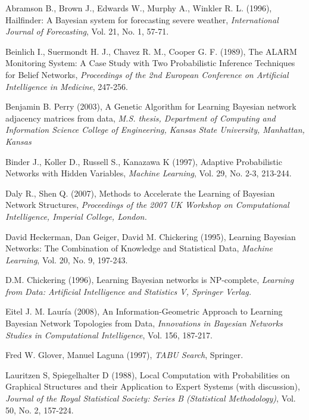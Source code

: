 \begin{bibliography}{99}
\begin{enumerate}

	
	 Abramson B., Brown J., Edwards W., Murphy A., Winkler R. L. (1996), Hailfinder: A Bayesian system for forecasting severe weather, \emph{International Journal of Forecasting}, Vol. 21, No. 1, 57-71.

	 Beinlich I., Suermondt H. J., Chavez R. M., Cooper G. F. (1989), The ALARM Monitoring System: A Case Study with Two Probabilistic Inference Techniques for Belief Networks, \emph{Proceedings of the 2nd European Conference on Artificial Intelligence in Medicine}, 247-256.
	
	 Benjamin B. Perry (2003), A Genetic Algorithm for Learning Bayesian network adjacency matrices from data, \emph{M.S. thesis, Department of Computing and Information Science College of Engineering, Kansas State University, Manhattan, Kansas}
	
	 Binder J., Koller D., Russell S., Kanazawa K (1997), Adaptive Probabilistic Networks with Hidden Variables, \emph{Machine Learning}, Vol. 29, No. 2-3, 213-244.
	
	 Daly R., Shen Q. (2007), Methods to Accelerate the Learning of Bayesian Network Structures, \emph{Proceedings of the 2007 UK Workshop on Computational Intelligence, Imperial College, London.}
	
	 David Heckerman, Dan Geiger, David M. Chickering (1995), Learning Bayesian Networks: The Combination of Knowledge and Statistical Data, \emph{Machine Learning}, Vol. 20, No. 9, 197-243.
	
	 D.M. Chickering (1996), Learning Bayesian networks is NP-complete, \emph{Learning from Data: Artificial Intelligence and Statistics V, Springer Verlag.}
	
     Eitel J. M. Lauría (2008), An Information-Geometric Approach to Learning Bayesian Network Topologies from Data, \emph{Innovations in Bayesian Networks Studies in Computational Intelligence}, Vol. 156, 187-217.

	 Fred W. Glover, Manuel Laguna (1997), \emph{TABU Search}, Springer.
		
	 Lauritzen S, Spiegelhalter D (1988), Local Computation with Probabilities on Graphical Structures and their Application to Expert Systems (with discussion), \emph{Journal of the Royal Statistical Society: Series B (Statistical Methodology)}, Vol. 50, No. 2, 157-224.
	

\end{enumerate}
\end{bibliography}
